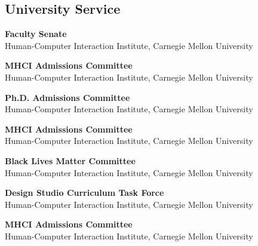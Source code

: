 \documentclass[11pt]{article} %
\begin{document}
\subsection*{University Service}

 \textbf{Faculty Senate}\\
Human-Computer Interaction Institute, Carnegie Mellon University
\medskip

 \textbf{MHCI Admissions Committee}\\
Human-Computer Interaction Institute, Carnegie Mellon University
\medskip

 \textbf{Ph.D. Admissions Committee}\\
Human-Computer Interaction Institute, Carnegie Mellon University
\medskip

 \textbf{MHCI Admissions Committee}\\
Human-Computer Interaction Institute, Carnegie Mellon University
\medskip

 \textbf{Black Lives Matter Committee}\\
Human-Computer Interaction Institute, Carnegie Mellon University
\medskip

 \textbf{Design Studio Curriculum Task Force}\\
Human-Computer Interaction Institute, Carnegie Mellon University
\medskip

 \textbf{MHCI Admissions Committee}\\
Human-Computer Interaction Institute, Carnegie Mellon University
\medskip



\vfill %





\end{document}
